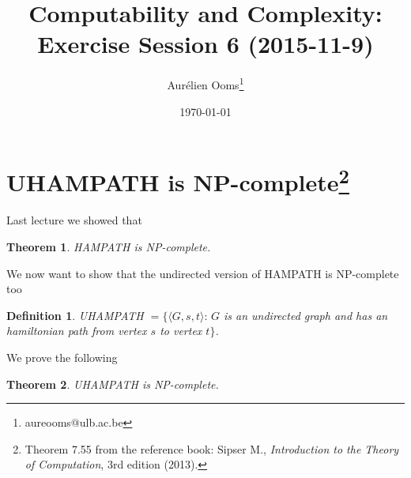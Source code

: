 \documentclass{article}
\title{Computability and Complexity:\\Exercise Session 6 (2015-11-9)}
\author{Aurélien Ooms\footnote{aureooms@ulb.ac.be}}
\date{\today}
\newcommand{\theoremname}{Theorem}
\newcommand{\definitionname}{Definition}
\newtheorem{theorem}{\theoremname}
\newtheorem{definition}{\definitionname}
\newcommand{\st}{\colon\,}
\begin{document}
\maketitle
\tableofcontents

\section{\texorpdfstring{UHAMPATH is NP-complete\footnote{%
Theorem 7.55 from the reference book: Sipser M.,
\emph{Introduction to the Theory of Computation}, 3rd edition
(2013).}}{UHAMPATH is NP-complete}}

Last lecture we showed that
\begin{theorem}
	HAMPATH is NP-complete.
\end{theorem}
We now want to show that the undirected version of HAMPATH is NP-complete too
\begin{definition}
	UHAMPATH \(= \{\langle G, s, t\rangle \st G\) is an undirected
	graph and has an hamiltonian path from vertex \(s\) to vertex
	\(t\}\).
\end{definition}
We prove the following
\begin{theorem}
	UHAMPATH is NP-complete.
\end{theorem}
\end{document}
